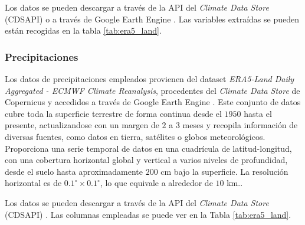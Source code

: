 Los datos se pueden descargar a través de la API del \textit{Climate Data Store} (CDSAPI) \cite{copernicus_api} o a través de Google Earth Engine \cite{copernicus_era5_land_daily}. Las variables extraídas se pueden están recogidas en la tabla \ref{tab:era5_land}.



\subsubsection*{Precipitaciones}

Los datos de precipitaciones empleados provienen del dataset \textit{ERA5-Land Daily Aggregated - ECMWF Climate Reanalysis}, procedentes del \textit{Climate Data Store} de Copernicus \cite{copernicus_api} y accedidos a través de Google Earth Engine \cite{copernicus_era5_land_daily}. Este conjunto de datos cubre toda la superficie terrestre de forma continua desde el $1950$ hasta el presente, actualizandose con un margen de $2$ a $3$ meses y recopila información de diversas fuentes, como datos en tierra, satélites o globos meteorológicos. Proporciona una serie temporal de datos en una cuadrícula de latitud-longitud, con una cobertura horizontal global y vertical a varios niveles de profundidad, desde el suelo hasta aproximadamente $200$ cm bajo la superficie. La resolución horizontal es de $0.1^\circ \times 0.1^\circ$, lo que equivale a alrededor de $10$ km..

Los datos se pueden descargar a través de la API del \textit{Climate Data Store} (CDSAPI) \cite{copernicus_api}. Las columnas empleadas se puede ver en la Tabla \ref{tab:era5_land}.


